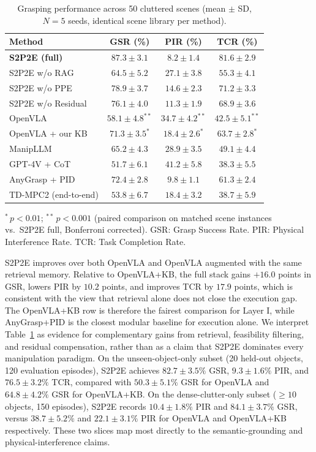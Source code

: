\documentclass[12pt]{article}
\begin{document}
\begin{table}[!htbp]
\centering
\caption{Grasping performance across 50 cluttered scenes (mean $\pm$ SD, $N=5$ seeds, identical scene library per method).}
\label{tab:grasp}
\small\setlength{\tabcolsep}{5pt}
\begin{tabular}{@{}l c c c@{}}
\toprule
Method & GSR (\%) & PIR (\%) & TCR (\%) \\
\midrule
\textbf{S2P2E (full)} & $\mathbf{87.3 \pm 3.1}$ & $8.2 \pm 1.4$ & $81.6 \pm 2.9$ \\
S2P2E w/o RAG & $64.5 \pm 5.2$ & $27.1 \pm 3.8$ & $55.3 \pm 4.1$ \\
S2P2E w/o PPE & $78.9 \pm 3.7$ & $14.6 \pm 2.3$ & $71.2 \pm 3.3$ \\
S2P2E w/o Residual & $76.1 \pm 4.0$ & $11.3 \pm 1.9$ & $68.9 \pm 3.6$ \\
OpenVLA~\cite{kim2024openvla} & $58.1 \pm 4.8^{**}$ & $34.7 \pm 4.2^{**}$ & $42.5 \pm 5.1^{**}$ \\
OpenVLA + our KB & $71.3 \pm 3.5^{*}$ & $18.4 \pm 2.6^{*}$ & $63.7 \pm 2.8^{*}$ \\
ManipLLM~\cite{li2024manipllm} & $65.2 \pm 4.3$ & $28.9 \pm 3.5$ & $49.1 \pm 4.4$ \\
GPT-4V + CoT & $51.7 \pm 6.1$ & $41.2 \pm 5.8$ & $38.3 \pm 5.5$ \\
AnyGrasp + PID & $72.4 \pm 2.8$ & $9.8 \pm 1.1$ & $61.3 \pm 2.4$ \\
TD-MPC2 (end-to-end) & $53.8 \pm 6.7$ & $18.4 \pm 3.2$ & $38.7 \pm 5.9$ \\
\bottomrule
\end{tabular}
\par\smallskip\footnotesize
$^{*}\,p < 0.01$; $^{**}\,p < 0.001$ (paired comparison on matched scene instances vs.\ S2P2E full, Bonferroni corrected). GSR: Grasp Success Rate. PIR: Physical Interference Rate. TCR: Task Completion Rate.
\end{table}

S2P2E improves over both OpenVLA and OpenVLA augmented with the same retrieval memory. Relative to OpenVLA+KB, the full stack gains $+16.0$ points in GSR, lowers PIR by $10.2$ points, and improves TCR by $17.9$ points, which is consistent with the view that retrieval alone does not close the execution gap. The OpenVLA+KB row is therefore the fairest comparison for Layer I, while AnyGrasp+PID is the closest modular baseline for execution alone. We interpret Table~\ref{tab:grasp} as evidence for complementary gains from retrieval, feasibility filtering, and residual compensation, rather than as a claim that S2P2E dominates every manipulation paradigm. On the unseen-object-only subset (20 held-out objects, 120 evaluation episodes), S2P2E achieves $82.7\pm3.5\%$ GSR, $9.3\pm1.6\%$ PIR, and $76.5\pm3.2\%$ TCR, compared with $50.3\pm5.1\%$ GSR for OpenVLA and $64.8\pm4.2\%$ GSR for OpenVLA+KB. On the dense-clutter-only subset ($\geq10$ objects, 150 episodes), S2P2E records $10.4\pm1.8\%$ PIR and $84.1\pm3.7\%$ GSR, versus $38.7\pm5.2\%$ and $22.1\pm3.1\%$ PIR for OpenVLA and OpenVLA+KB respectively. These two slices map most directly to the semantic-grounding and physical-interference claims.
\end{document}
